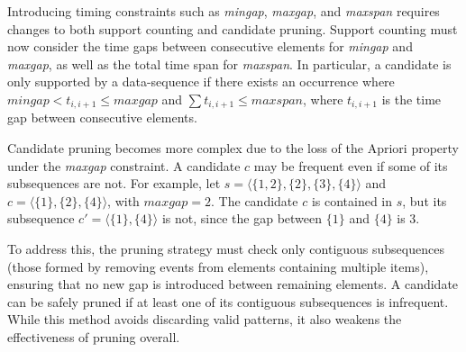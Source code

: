 Introducing timing constraints such as \textit{mingap}, \textit{maxgap}, and \textit{maxspan} requires changes to both support counting and candidate pruning. Support counting must now consider the time gaps between consecutive elements for \textit{mingap} and \textit{maxgap}, as well as the total time span for \textit{maxspan}. In particular, a candidate is only supported by a data-sequence if there exists an occurrence where $mingap < t_{i,i+1} \leq maxgap$ and $\sum t_{i,i+1} \leq maxspan$, where $t_{i,i+1}$ is the time gap between consecutive elements.

Candidate pruning becomes more complex due to the loss of the Apriori property under the \textit{maxgap} constraint. A candidate $c$ may be frequent even if some of its subsequences are not. For example, let $s = \langle \{1,2\}, \{2\}, \{3\}, \{4\} \rangle$ and $c = \langle \{1\}, \{2\}, \{4\} \rangle$, with $maxgap = 2$. The candidate $c$ is contained in $s$, but its subsequence $c' = \langle \{1\}, \{4\} \rangle$ is not, since the gap between $\{1\}$ and $\{4\}$ is 3.

To address this, the pruning strategy must check only contiguous subsequences (those formed by removing events from elements containing multiple items), ensuring that no new gap is introduced between remaining elements. A candidate can be safely pruned if at least one of its contiguous subsequences is infrequent. While this method avoids discarding valid patterns, it also weakens the effectiveness of pruning overall.
